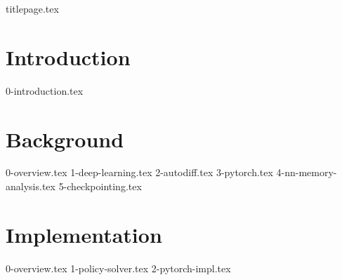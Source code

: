 \documentclass[12pt,twoside]{report}
\begin{document}
{titlepage.tex}

\clearpage{\pagestyle{empty}\cleardoublepage}
\setcounter{page}{1}
\pagestyle{fancy}

\begin{abstract}
{0-abstract.tex}
\end{abstract}

\cleardoublepage


\tableofcontents
\clearpage{\pagestyle{empty}}

\listoffigures
\clearpage{\pagestyle{empty}}

\listoflistings

\listofalgorithms

\clearpage{\pagestyle{empty}\cleardoublepage}
\setcounter{page}{1}
\fancyhead[LE,RO]{\slshape \rightmark}
\fancyhead[LO,RE]{\slshape \leftmark}

\chapter{Introduction}
{0-introduction.tex}

\chapter{Background}
{0-overview.tex}
{1-deep-learning.tex}
{2-autodiff.tex}
{3-pytorch.tex}
{4-nn-memory-analysis.tex}
{5-checkpointing.tex}

\chapter{Implementation}
{0-overview.tex}
{1-policy-solver.tex}
{2-pytorch-impl.tex}
\end{document}
